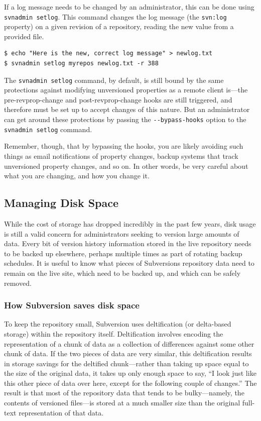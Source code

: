 If a log message needs to be changed by an administrator, this can be
done using \texttt{svnadmin\ setlog}. This command changes the log
message (the \texttt{svn:log} property) on a given revision of a
repository, reading the new value from a provided file.

\begin{verbatim}
$ echo "Here is the new, correct log message" > newlog.txt
$ svnadmin setlog myrepos newlog.txt -r 388
\end{verbatim}

The \texttt{svnadmin\ setlog} command, by default, is still bound by the
same protections against modifying unversioned properties as a remote
client is---the pre-revprop-change and post-revprop-change hooks are
still triggered, and therefore must be set up to accept changes of this
nature. But an administrator can get around these protections by passing
the \texttt{-\/-bypass-hooks} option to the \texttt{svnadmin\ setlog}
command.

Remember, though, that by bypassing the hooks, you are likely avoiding
such things as email notifications of property changes, backup systems
that track unversioned property changes, and so on. In other words, be
very careful about what you are changing, and how you change it.

\subsection{Managing Disk Space}\label{svn.reposadmin.maint.diskspace}

While the cost of storage has dropped incredibly in the past few years,
disk usage is still a valid concern for administrators seeking to
version large amounts of data. Every bit of version history information
stored in the live repository needs to be backed up elsewhere, perhaps
multiple times as part of rotating backup schedules. It is useful to
know what pieces of Subversion\textquotesingle s repository data need to
remain on the live site, which need to be backed up, and which can be
safely removed.

\subsubsection{How Subversion saves disk
space}\label{svn.reposadmin.maint.diskspace.deltas}

To keep the repository small, Subversion uses deltification (or
delta-based storage) within the repository itself. Deltification
involves encoding the representation of a chunk of data as a collection
of differences against some other chunk of data. If the two pieces of
data are very similar, this deltification results in storage savings for
the deltified chunk---rather than taking up space equal to the size of
the original data, it takes up only enough space to say, ``I look just
like this other piece of data over here, except for the following couple
of changes.'' The result is that most of the repository data that tends
to be bulky---namely, the contents of versioned files---is stored at a
much smaller size than the original full-text representation of that
data.

